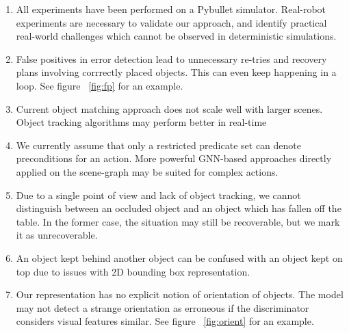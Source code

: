\begin{enumerate}
    \item All experiments have been performed on a Pybullet simulator. Real-robot experiments are necessary to validate our approach, and identify practical real-world challenges which cannot be observed in deterministic simulations.
    
    \item False positives in error detection lead to unnecessary re-tries and recovery plans involving corrrectly placed objects. This can even keep happening in a loop. See figure ~\ref{fig:fp} for an example.

    \item Current object matching approach does not scale well with larger scenes. Object tracking algorithms may perform better in real-time

    \item We currently assume that only a restricted predicate set can denote preconditions for an action. More powerful GNN-based approaches directly applied on the scene-graph may be suited for complex actions.

    \item Due to a single point of view and lack of object tracking, we cannot distinguish between an occluded object and an object which has fallen off the table. In the former case, the situation may still be recoverable, but we mark it as unrecoverable.

    \item An object kept behind another object can be confused with an object kept on top due to issues with 2D bounding box representation. 
    
    \item Our representation has no explicit notion of orientation of objects. The model may not detect a strange orientation as erroneous if the discriminator considers visual features similar. See figure ~\ref{fig:orient} for an example.
\end{enumerate}


